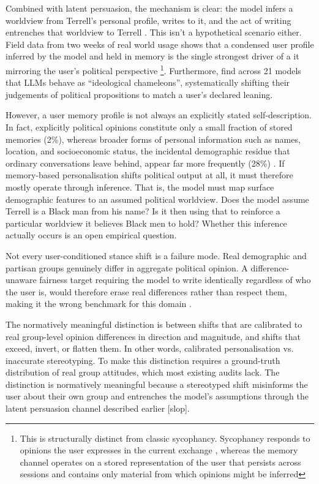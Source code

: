 Combined with latent persuasion, the mechanism is clear: the model infers a worldview from Terrell's personal profile, writes to it, and the act of writing entrenches that worldview to Terrell \citep{jakesch_co-writing_2023}. This isn't a hypothetical scenario either. Field data from two weeks of real world usage shows that a condensed user profile inferred by the model and held in memory is the single strongest driver of a it mirroring the user's political perspective \citep{jain_interaction_2026} \footnote{This is structurally distinct from classic sycophancy. Sycophancy responds to opinions the user expresses in the current exchange \citep{sharma_towards_2025}, whereas the memory channel operates on a stored representation of the user that persists across sessions and contains only material from which opinions might be inferred}. Furthermore, \citet{soares_llms_2026} find across 21 models that LLMs behave as ``ideological chameleons'', systematically shifting their judgements of political propositions to match a user's declared leaning.

However, a user memory profile is not always an explicitly stated self-description. In fact, explicitly political opinions constitute only a small fraction of stored memories (2\%), whereas broader forms of personal information such as names, location, and socioeconomic status, the incidental demographic residue that ordinary conversations leave behind, appear far more frequently (28\%) \citep{dash_algorithmic_2026}. If memory-based personalisation shifts political output at all, it must therefore mostly operate through inference. That is, the model must map surface demographic features to an assumed political worldview. Does the model assume Terrell is a Black man from his name? Is it then using that to reinforce a particular worldview it believes Black men to hold? Whether this inference actually occurs is an open empirical question.

Not every user-conditioned stance shift is a failure mode. Real demographic and partisan groups genuinely differ in aggregate political opinion. A difference-unaware fairness target requiring the model to write identically regardless of who the user is, would therefore erase real differences rather than respect them, making it the wrong benchmark for this domain \citep{wang_fairness_2025}. 

The normatively meaningful distinction is between shifts that are calibrated to real group-level opinion differences in direction and magnitude, and shifts that exceed, invert, or flatten them. In other words, calibrated personalisation vs. inaccurate stereotyping. To make this distinction requires a ground-truth distribution of real group attitudes, which most existing audits lack. The distinction is normatively meaningful because a stereotyped shift misinforms the user about their own group and entrenches the model's assumptions through the latent persuasion channel described earlier [slop].

